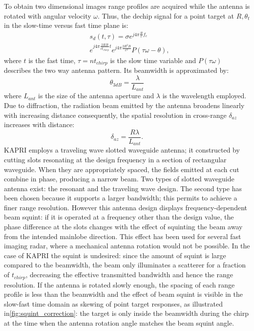 To obtain two dimensional images range profiles are acquired while the antenna is rotated with angular velocity $\omega$.
Thus, the dechip signal for a point target at $R, \theta_{t}$ in the slow-time versus fast time plane is:
\begin{equation}\label{eq:signal_model}
	\begin{aligned}
	& s_{d}\left(t,\tau\right) = \sigma e^{j 4 \pi \frac{ R}{c}f_c}   \\
	& e^{j 4 \pi \frac{2 R B }{c t_{chirp}} t}  e^{j 4 \pi \frac{2 R^2 B}{c^2}} P\left(\tau \omega - \theta\right),
	\end{aligned}
\end{equation} 
where $t$ is the fast time, $\tau = n t_{chirp}$ is the slow time variable and $P\left(\tau \omega\right)$ describes the two way antenna pattern. Its beamwidth is approximated by:
\begin{equation}\label{eq:azimuth_resolution}
	\theta_{3dB} = \frac{\lambda}{L_{ant}}
\end{equation}
where $L_{ant}$ is the size of the antenna aperture and $\lambda$ is the wavelength employed.
Due to diffraction, the radiation beam emitted by the antenna broadens linearly with increasing distance consequently, the spatial resolution in cross-range $\delta_{az}$ increases with distance:
\begin{equation}\label{eq:azimuth_ground_resolution}
	\delta_{az} = \frac{R \lambda}{L_{ant}}.
\end{equation}
KAPRI employs a traveling wave slotted waveguide antenna\cite{Hines1953a,Granet2007}; it constructed by cutting slots resonating at the design frequency in a section of rectangular waveguide. When they are appropriately spaced, the fields emitted at each cut combine in phase, producing a narrow beam. Two types of slotted waveguide antenna exist\cite{Enjiu2013}: the resonant and the traveling wave design. The second type has been chosen because it supports a larger bandwidth; this permits to achieve a finer range resolution. However this antenna design displays frequency-dependent beam squint: if it is operated at a frequency other than the design value, the phase difference at the slots changes with the effect of squinting the beam away from the intended mainlobe direction. This effect has been used for several fast imaging radar, where a mechanical antenna rotation would not be possible\cite{Yang2014,Yang2012,Mayer2003,Alvarez2013}. In the case of KAPRI the squint is undesired: since the amount of squint is large compared to the beamwidth, the beam only illuminates a scatterer for a fraction of $t_{chirp}$, decreasing the effective transmitted bandwidth and hence the range resolution.  If the antenna is rotated slowly enough,  the spacing of each range profile is less than the beamwidth and the effect of beam squint is visible in the slow-fast time domain as skewing of point target responses, as illustrated in\autoref{fig:squint_correction}: the target is only inside the beamwidth during the chirp at the time when the antenna rotation angle matches the beam squint angle. 
